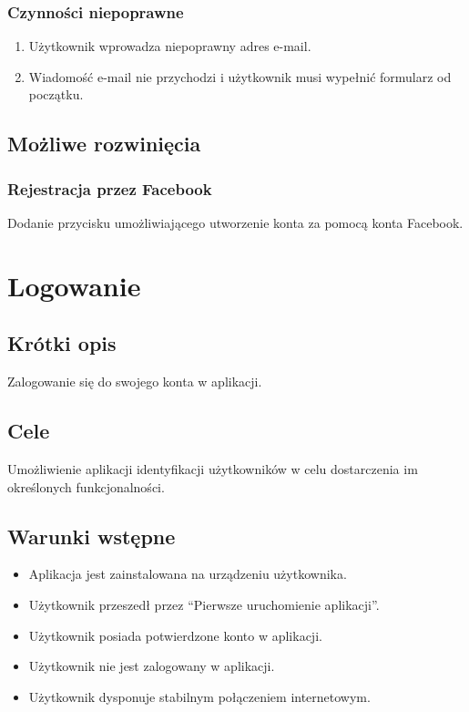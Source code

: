 \documentclass[12pt,a4paper,twoside]{article}
\begin{document}
    
    \subsubsection{Czynności niepoprawne}
    \begin{enumerate}
        \item Użytkownik wprowadza niepoprawny adres e-mail.
        \item Wiadomość e-mail nie przychodzi i użytkownik musi wypełnić formularz od początku.
    \end{enumerate}
    
    
    \subsection{Możliwe rozwinięcia}
    
    
    \subsubsection{Rejestracja przez Facebook}
    Dodanie przycisku umożliwiającego utworzenie konta za pomocą konta Facebook.


    \section{Logowanie}
    
    
    \subsection{Krótki opis}
    Zalogowanie się do swojego konta w aplikacji.
    
    
    \subsection{Cele}
    Umożliwienie aplikacji identyfikacji użytkowników w celu dostarczenia im określonych funkcjonalności.
    
    
    \subsection{Warunki wstępne}
    \begin{itemize}
        \item Aplikacja jest zainstalowana na urządzeniu użytkownika.
        \item Użytkownik przeszedł przez ``Pierwsze uruchomienie aplikacji''.
     \item Użytkownik posiada potwierdzone konto w aplikacji.
 \item Użytkownik nie jest zalogowany w aplikacji.    
        \item Użytkownik dysponuje stabilnym połączeniem internetowym.
    \end{itemize}
    
\end{document}
